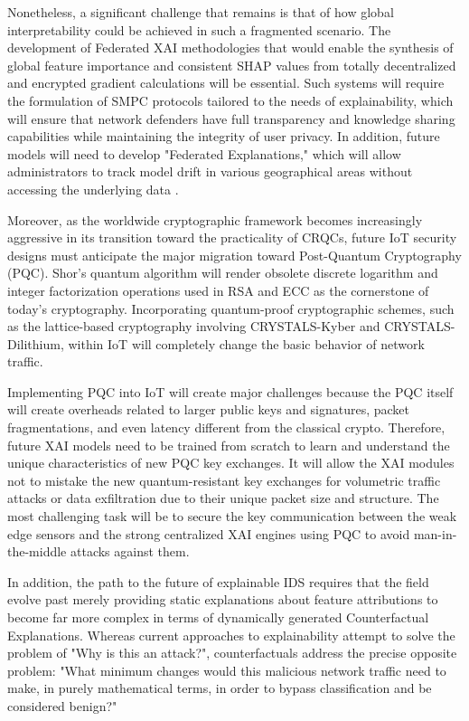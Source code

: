 \documentclass[12pt]{article}
\begin{document}
Nonetheless, a significant challenge that remains is that of how global interpretability could be achieved in such a fragmented scenario. The development of Federated XAI methodologies that would enable the synthesis of global feature importance and consistent SHAP values from totally decentralized and encrypted gradient calculations will be essential. Such systems will require the formulation of SMPC protocols tailored to the needs of explainability, which will ensure that network defenders have full transparency and knowledge sharing capabilities while maintaining the integrity of user privacy. In addition, future models will need to develop "Federated Explanations," which will allow administrators to track model drift in various geographical areas without accessing the underlying data \cite{nguyen2022explainable, ijcrt2025threat}.


Moreover, as the worldwide cryptographic framework becomes increasingly aggressive in its transition toward the practicality of CRQCs, future IoT security designs must anticipate the major migration toward Post-Quantum Cryptography (PQC). Shor's quantum algorithm will render obsolete discrete logarithm and integer factorization operations used in RSA and ECC as the cornerstone of today's cryptography. Incorporating quantum-proof cryptographic schemes, such as the lattice-based cryptography involving CRYSTALS-Kyber and CRYSTALS-Dilithium, within IoT will completely change the basic behavior of network traffic.

Implementing PQC into IoT will create major challenges because the PQC itself will create overheads related to larger public keys and signatures, packet fragmentations, and even latency different from the classical crypto. Therefore, future XAI models need to be trained from scratch to learn and understand the unique characteristics of new PQC key exchanges. It will allow the XAI modules not to mistake the new quantum-resistant key exchanges for volumetric traffic attacks or data exfiltration due to their unique packet size and structure. The most challenging task will be to secure the key communication between the weak edge sensors and the strong centralized XAI engines using PQC to avoid man-in-the-middle attacks against them.


In addition, the path to the future of explainable IDS requires that the field evolve past merely providing static explanations about feature attributions to become far more complex in terms of dynamically generated Counterfactual Explanations. Whereas current approaches to explainability attempt to solve the problem of "Why is this an attack?", counterfactuals address the precise opposite problem: "What minimum changes would this malicious network traffic need to make, in purely mathematical terms, in order to bypass classification and be considered benign?"
\end{document}
